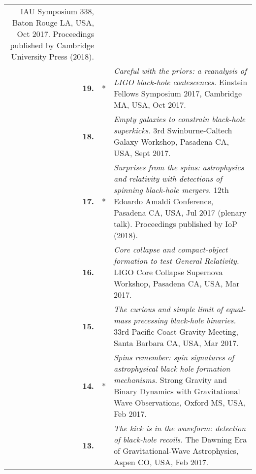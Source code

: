 \documentclass[11pt,letterpaper,sans]{moderncv}   %
\begin{document}
{\begin{longtable}{rp{0.4cm}p{15.8cm}}
\newline{} IAU Symposium 338, Baton Rouge LA, USA, Oct 2017.
\newline{}Proceedings published by Cambridge University Press (2018).
\vspace{0.05cm}\\
%
\textbf{19.} & * & \textit{Careful with the priors: a reanalysis of LIGO black-hole coalescences.}
\newline{} Einstein Fellows Symposium 2017, Cambridge MA, USA, Oct 2017.
\vspace{0.05cm}\\
%
\textbf{18.} & & \textit{Empty galaxies to constrain black-hole superkicks.}
\newline{} 3rd Swinburne-Caltech Galaxy Workshop, Pasadena CA, USA, Sept 2017.
\vspace{0.05cm}\\
%
\textbf{17.} & * & \textit{Surprises from the spins: astrophysics and relativity with detections of spinning black-hole mergers.}
\newline{}12th Edoardo Amaldi Conference, Pasadena CA, USA, Jul 2017 (plenary talk).
\newline{}Proceedings published by IoP (2018).
\vspace{0.05cm}\\
%
\textbf{16.} & & \textit{Core collapse and compact-object formation to test General Relativity.}
\newline{}LIGO Core Collapse Supernova Workshop, Pasadena CA, USA, Mar 2017.
\vspace{0.05cm}\\
%
\textbf{15.} & & \textit{The curious and simple limit of equal-mass precessing black-hole binaries.}
\newline{}33rd Pacific Coast Gravity Meeting, Santa Barbara CA, USA, Mar 2017.
\vspace{0.05cm}\\
%
\textbf{14.} & * & \textit{Spins remember: spin signatures of astrophysical black hole formation mechanisms.}
\newline{}Strong Gravity and Binary Dynamics with Gravitational Wave Observations, Oxford MS, USA, Feb 2017.
\vspace{0.05cm}\\
%
\textbf{13.} & & \textit{The kick is in the waveform: detection of black-hole recoils.}
\newline{}The Dawning Era of Gravitational-Wave Astrophysics, Aspen CO, USA, Feb 2017.
\vspace{0.05cm}\\

\end{longtable}}
\end{document}
